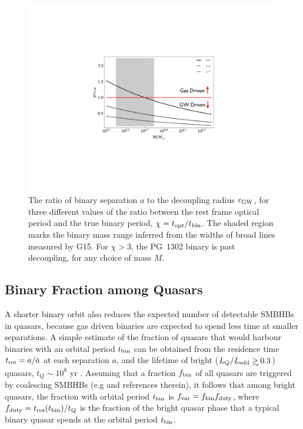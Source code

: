 \begin{figure}
\begin{center}
\includegraphics[scale=0.36]{figures/ch3/fig2}  \vspace{-15 pt}
\end{center}
\caption{The ratio of binary separation $a$ to the decoupling radius
  $r_{\rm GW}$, for three different values of the ratio between the
  rest frame optical period and the true binary period, $\chi=t_{\rm
    opt}/t_{\rm{bin}}$. The shaded region marks the binary mass
  range inferred from the widths of broad lines measured by G15. For $\chi>3$,
  the PG~1302 binary is past decoupling, for any choice of mass $M$.}
\label{Fig:Decoupling}
\end{figure}





\subsection{Binary Fraction among Quasars}
\label{SS:Rates}

A shorter binary orbit also reduces the expected number of detectable
SMBHBs in quasars, because gas driven binaries are expected to spend less time at
smaller separations.  A simple estimate of the fraction of quasars
that would harbour binaries with an orbital period $t_{\rm bin}$ can be
obtained from the residence time $t_{\rm res} = a/ \dot{a}$ at each
separation $a$, and the lifetime of bright ($L_Q /L_{\rm{edd}} \gsim
0.3$) quasars, $t_Q \sim 10^8$ yr \citep{PMartini:2004}.  Assuming
that a fraction $f_{\rm{bin}}$ of all quasars are triggered by coalescing
SMBHBs (e.g \citealt{Hopkins2007a} and references therein), it follows
that among bright quasars, the fraction with orbital period $t_{\rm{bin}}$
is $f_{\rm var}=f_{\rm bin}f_{\rm duty}$, where $f_{\rm{duty}} = {t_{
    \rm{res}} (t_{\rm{bin}}) }/{t_Q}$ is the fraction of the bright quasar
phase that a typical binary quasar spends at the orbital period
$t_{\rm bin}$.

